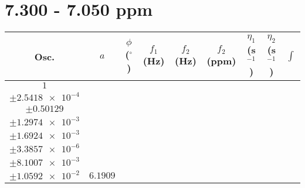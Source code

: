 \documentclass[8pt]{article}
\begin{document}
\section*{7.300 - 7.050 ppm}
\begin{longtable}[l]{c c c c c c c c c}
\toprule
Osc. & $a$ & $\phi$ ($^{\circ}$) & $f_1$ (Hz) & $f_2$ (Hz) & $f_2$ (ppm) & $\eta_1$ (s$^{-1}$) & $\eta_2$ (s$^{-1}$) & $\int$\\
\midrule
$\num{1}$ & \begin{tabular}[c]{@{}c@{}}$\num{2.9194e-2}$ \\ $\pm\num{2.5418e-4}$\end{tabular} & \begin{tabular}[c]{@{}c@{}}$\num{0.29155}$ \\ $\pm\num{0.50129}$\end{tabular} & \begin{tabular}[c]{@{}c@{}}$\num{-7.9082}$ \\ $\pm\num{1.2974e-3}$\end{tabular} & \begin{tabular}[c]{@{}c@{}}$\num{3.5396e+3}$ \\ $\pm\num{1.6924e-3}$\end{tabular} & \begin{tabular}[c]{@{}c@{}}$\num{7.0811}$ \\ $\pm\num{3.3857e-6}$\end{tabular} & \begin{tabular}[c]{@{}c@{}}$\num{0.75253}$ \\ $\pm\num{8.1007e-3}$\end{tabular} & \begin{tabular}[c]{@{}c@{}}$\num{0.7039}$ \\ $\pm\num{1.0592e-2}$\end{tabular} & $\num{6.1909}$\\

\end{longtable}
\end{document}
